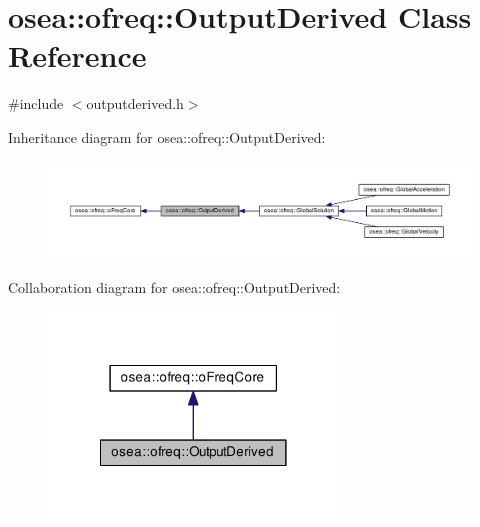 \hypertarget{classosea_1_1ofreq_1_1_output_derived}{\section{osea\-:\-:ofreq\-:\-:Output\-Derived Class Reference}
\label{classosea_1_1ofreq_1_1_output_derived}
}


{\ttfamily \#include $<$outputderived.\-h$>$}



Inheritance diagram for osea\-:\-:ofreq\-:\-:Output\-Derived\-:
\nopagebreak
\begin{figure}[H]
\begin{center}
\leavevmode
\includegraphics[width=350pt]{classosea_1_1ofreq_1_1_output_derived__inherit__graph}
\end{center}
\end{figure}


Collaboration diagram for osea\-:\-:ofreq\-:\-:Output\-Derived\-:
\nopagebreak
\begin{figure}[H]
\begin{center}
\leavevmode
\includegraphics[width=218pt]{classosea_1_1ofreq_1_1_output_derived__coll__graph}
\end{center}
\end{figure}
